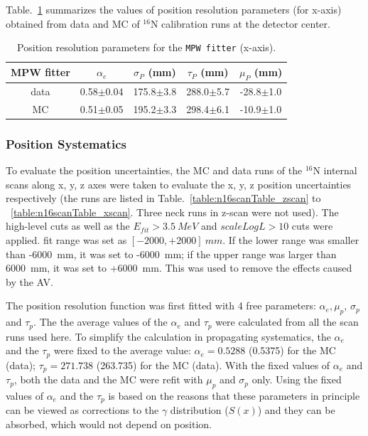 Table.~\ref{tab:posresol} summarizes the values of position resolution parameters (for x-axis) obtained from data and MC of {$^{16}$}N calibration runs at the detector center.
\vspace{1mm}
\begin{table}[ht]
	\centering
	\caption{Position resolution parameters for the \texttt{MPW fitter} (x-axis).}
	\label{tab:posresol}
	\begin{tabular}{ccccc}
		\toprule
		MPW fitter & $\alpha_e$ & $\sigma_P$ (mm) &  $\tau_P$ (mm)& $\mu_P$ (mm)\\
		\hline 
		data& 0.58$\pm$0.04 & 175.8$\pm$3.8 & 288.0$\pm$5.7 & -28.8$\pm$1.0\\	
		\hline 
		MC & 0.51$\pm$0.05 & 195.2$\pm$3.3 & 298.4$\pm$6.1 & -10.9$\pm$1.0\\
		\bottomrule
	\end{tabular}
\end{table}
\vspace{1mm}

\subsubsection{Position Systematics}
To evaluate the position uncertainties, the MC and data runs of the $^{16}$N internal scans along x, y, z axes were taken to evaluate the x, y, z position uncertainties respectively (the runs are listed in Table.~\ref{table:n16scanTable_zscan} to ~\ref{table:n16scanTable_xscan}. Three neck runs in z-scan were not used). The high-level cuts as well as the $E_{fit}>3.5~MeV$ and $scaleLogL>10$ cuts were applied. 
fit range was set as $[-2000, +2000]~mm$. If the lower range was smaller than -6000~mm, it was set to -6000~mm; if the upper range was larger than 6000~mm, it was set to +6000~mm. This was used to remove the effects caused by the AV.

The position resolution function was first fitted with 4 free parameters: $\alpha_e,\mu_p$, $\sigma_p$ and $\tau_p$. The the average values of the $\alpha_e$
and $\tau_p$ were calculated from all the scan runs used here. To simplify the calculation in propagating systematics, the $\alpha_e$ and the $\tau_p$ were fixed to the average value: $\alpha_e=0.5288$ (0.5375) for the MC (data); $\tau_p=271.738$ (263.735) for the MC (data). With the fixed values of $\alpha_e$ and $\tau_p$, both the data and the MC were refit with $\mu_p$ and $\sigma_p$ only. Using the fixed values of $\alpha_e$ and the $\tau_p$ is based on the reasons that these parameters in principle can be viewed as corrections to the $\gamma$ distribution ($S(x)$) and they can be absorbed, which would not depend on position\cite{waterunidoc}. 

